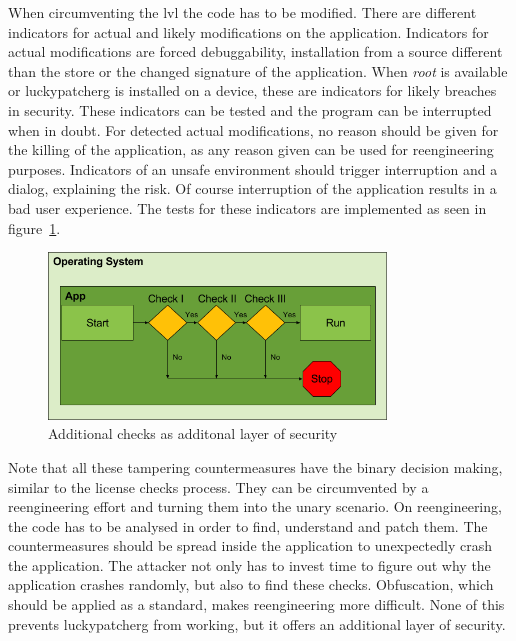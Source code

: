 When circumventing the \gls{lvl} the code has to be modified.
There are different indicators for actual and likely modifications on the application.
Indicators for actual modifications are forced debuggability, installation from a source different than the store or the changed signature of the application.
When \textit{root} is available or \gls{luckypatcherg} is installed on a device, these are indicators for likely breaches in security.
\newline
These indicators can be tested and the program can be interrupted when in doubt.
For detected actual modifications, no reason should be given for the killing of the application, as any reason given can be used for reengineering purposes.
Indicators of an unsafe environment should trigger interruption and a dialog, explaining the risk.
Of course interruption of the application results in a bad user experience.
The tests for these indicators are implemented as seen in figure~\ref{fig:verificationNowAdditional}.
\begin{figure}[h]
    \centering
    \includegraphics[width=0.8\textwidth]{data/verificationNowAdditional.png}
    \caption{Additional checks as additonal layer of security}
    \label{fig:verificationNowAdditional}
\end{figure}
\newline
Note that all these tampering countermeasures have the binary decision making, similar to the license checks process.
They can be circumvented by a reengineering effort and turning them into the unary scenario.
\newline
On reengineering, the code has to be analysed in order to find, understand and patch them.
The countermeasures should be spread inside the application to unexpectedly crash the application.
The attacker not only has to invest time to figure out why the application crashes randomly, but also to find these checks.
Obfuscation, which should be applied as a standard, makes reengineering more difficult.
\newline
None of this prevents \gls{luckypatcherg} from working, but it offers an additional layer of security.
